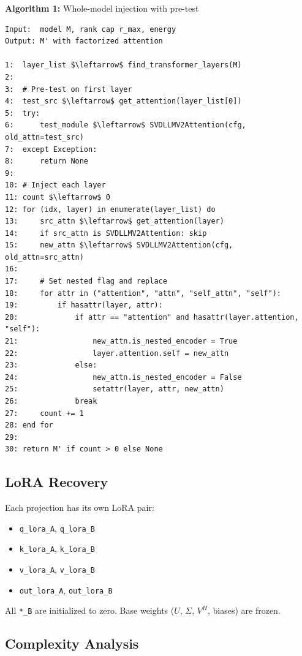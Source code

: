 \textbf{Algorithm 1:} Whole-model injection with pre-test
\begin{lstlisting}
Input:  model M, rank cap r_max, energy  
Output: M' with factorized attention

1:  layer_list $\leftarrow$ find_transformer_layers(M)
2:
3:  # Pre-test on first layer
4:  test_src $\leftarrow$ get_attention(layer_list[0])
5:  try:
6:      test_module $\leftarrow$ SVDLLMV2Attention(cfg, old_attn=test_src)
7:  except Exception:
8:      return None
9:
10: # Inject each layer
11: count $\leftarrow$ 0
12: for (idx, layer) in enumerate(layer_list) do
13:     src_attn $\leftarrow$ get_attention(layer)
14:     if src_attn is SVDLLMV2Attention: skip
15:     new_attn $\leftarrow$ SVDLLMV2Attention(cfg, old_attn=src_attn)
16:
17:     # Set nested flag and replace
18:     for attr in ("attention", "attn", "self_attn", "self"):
19:         if hasattr(layer, attr):
20:             if attr == "attention" and hasattr(layer.attention, "self"):
21:                 new_attn.is_nested_encoder = True
22:                 layer.attention.self = new_attn
23:             else:
24:                 new_attn.is_nested_encoder = False
25:                 setattr(layer, attr, new_attn)
26:             break
27:     count += 1
28: end for
29:
30: return M' if count > 0 else None
\end{lstlisting}

\subsection{LoRA Recovery}

Each projection has its own LoRA pair:

\begin{itemize}
\item \texttt{q\_lora\_A}, \texttt{q\_lora\_B}
\item \texttt{k\_lora\_A}, \texttt{k\_lora\_B}
\item \texttt{v\_lora\_A}, \texttt{v\_lora\_B}
\item \texttt{out\_lora\_A}, \texttt{out\_lora\_B}

\end{itemize}
All \texttt{*\_B} are initialized to zero. Base weights ($U$, $\Sigma$, $V^H$, biases) 
are frozen.

\subsection{Complexity Analysis}

